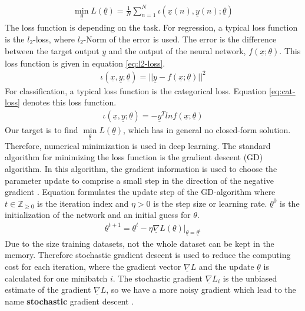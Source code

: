 \documentclass[12pt,DIV14,BCOR12mm,a4paper,footexclude,headinclude,halfparskip-,twoside,openright,openany,cleardoubleempty,idxtotoc,bibtotoc]{scrreprt} %
\numberwithin{equation}{chapter}
\begin{document}
\begin{align}
	\underset{\underline{\theta}}\min L(\underline{\theta}) = \frac{1}{N}\sum_{n=1}^{N}\iota(\underline{x}(n),\underline{y}(n);\underline{\theta})  \label{eq:CostFunction}
\end{align}
The loss function is depending on the task. For regression, a typical loss function is the $l_{2}$-loss, where $l_{2}$-Norm of the error is used. The error is the difference between the target output $\underline{y}$ and the output of the neural network, $f(\underline{x};\underline{\theta})$. This loss function is given in equation \ref{eq:l2-loss}.
\begin{align}
	\iota(\underline{x},\underline{y};\underline{\theta}) = ||\underline{y}-f(\underline{x};\underline{\theta})||^{2}\label{eq:l2-loss}
\end{align}
For classification, a typical loss function is the categorical loss. Equation \ref{eq:cat-loss} denotes this loss function.
\begin{align}
	\iota(\underline{x},\underline{y};\underline{\theta}) = -\underline{y}^{T}ln f(\underline{x};\underline{\theta})\label{eq:cat-loss}
\end{align}
Our target is to find $\underset{\underline{\theta}}\min L(\underline{\theta})$, which has in general no closed-form solution. Therefore, numerical minimization is used in deep learning. The standard algorithm for minimizing the loss function is the gradient descent (GD) algorithm. In this algorithm, the gradient information is used to choose the parameter update to comprise a small step in the direction of the negative gradient \cite{Bishop}. Equation formulates the update step of the GD-algorithm where $t \in \mathbb{Z}_{\geq0}$ is the iteration index and $\eta > 0$ is the step size or learning rate. $\underline{\theta}^{0}$ is the initialization of the network and an initial guess for $\theta$.
\begin{align}
	\underline{\theta}^{t+1} = \underline{\theta}^{t} - \eta\underline{\nabla}L(\underline{\theta})|_{\underline{\theta}=\underline{\theta}^{t}}\label{eq:GradientDescent_update}
\end{align}
Due to the size training datasets, not the whole dataset can be kept in the memory. Therefore stochastic gradient descent is used to reduce the computing cost for each iteration, where the gradient vector $\underline{\nabla}L$ and the update $\underline{\theta}$ is calculated for one minibatch $i$. The stochastic gradient $\underline{\nabla}L_{i}$ is the unbiased estimate of the gradient $\underline{\nabla}L$, so we have a more noisy gradient which lead to the name \textbf{stochastic} gradient descent \cite{DeepLearningDive}.\\
\end{document}

